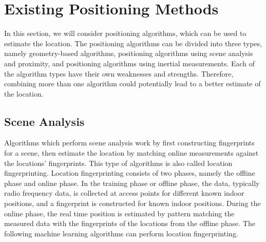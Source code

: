 \section{Existing Positioning Methods}
In this section, we will consider positioning algorithms, which can be used to estimate the location. The positioning algorithms can be divided into three types, namely geometry-based algorithms, positioning algorithms using scene analysis and proximity, and positioning algorithms using inertial measurements. Each of the algorithm types have their own weaknesses and strengths. Therefore, combining more than one algorithm could potentially lead to a better estimate of the location.

\subsection{Scene Analysis}
\label{sec:scene_analysis}
Algorithms which perform scene analysis work by first constructing fingerprints for a scene, then estimate the location by matching online measurements against the locations' fingerprints. This type of algorithms is also called location fingerprinting. Location fingerprinting consists of two phases, namely the offline phase and online phase. In the training phase or offline phase, the data, typically radio frequency data, is collected at access points for different known indoor positions, and a fingerprint is constructed for known indoor positions. During the online phase, the real time position is estimated by pattern matching the measured data with the fingerprints of the locations from the offline phase.\cite{IPS01} The following machine learning algorithms can perform location fingerprinting.

